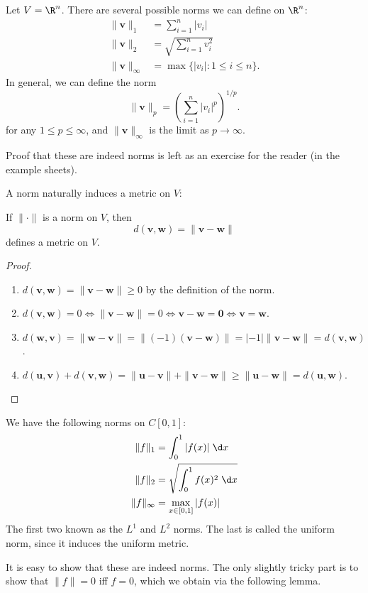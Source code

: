 \documentclass[a4paper]{article}
\begin{document}
\begin{eg}
  Let $V = \R^n$. There are several possible norms we can define on $\R^n$:
  \begin{align*}
    \|\mathbf{v}\|_1 &= \sum_{i = 1}^n  |v_i|\\
    \|\mathbf{v}\|_2 &= \sqrt{\sum_{i = 1}^n v_i^2}\\
    \|\mathbf{v}\|_\infty &= \max \{|v_i|: 1 \leq i \leq n\}.
  \end{align*}
  In general, we can define the norm
  \[
    \|\mathbf{v}\|_p = \left(\sum_{i = 1}^n |v_i|^p\right)^{1/p}.
  \]
  for any $1 \leq p \leq \infty$, and $\|\mathbf{v}\|_\infty$ is the limit as $p\to \infty$.

  Proof that these are indeed norms is left as an exercise for the reader (in the example sheets).
\end{eg}

A norm naturally induces a metric on $V$:
\begin{lemma}
  If $\|\cdot\|$ is a norm on $V$, then
  \[
    d(\mathbf{v}, \mathbf{w}) = \|\mathbf{v} - \mathbf{w}\|
  \]
  defines a metric on $V$.
\end{lemma}

\begin{proof}\leavevmode
  \begin{enumerate}
    \item $d(\mathbf{v}, \mathbf{w}) = \|\mathbf{v} - \mathbf{w}\| \geq 0$ by the definition of the norm.
    \item $d(\mathbf{v}, \mathbf{w}) = 0 \Leftrightarrow \|\mathbf{v} - \mathbf{w}\| = 0 \Leftrightarrow \mathbf{v} - \mathbf{w} = \mathbf{0} \Leftrightarrow \mathbf{v} = \mathbf{w}$.
    \item $d(\mathbf{w}, \mathbf{v}) = \|\mathbf{w} - \mathbf{v}\| = \|(-1)(\mathbf{v} - \mathbf{w})\| = |-1| \|\mathbf{v} - \mathbf{w}\| = d(\mathbf{v}, \mathbf{w})$.
    \item $d(\mathbf{u}, \mathbf{v}) + d(\mathbf{v}, \mathbf{w}) = \|\mathbf{u} - \mathbf{v}\| + \|\mathbf{v} - \mathbf{w}\| \geq \|\mathbf{u} - \mathbf{w}\| = d(\mathbf{u}, \mathbf{w})$.
  \end{enumerate}
\end{proof}

\begin{eg}
  We have the following norms on $C[0, 1]$:
  \begin{align*}
    \|f\|_1 &= \int_0^1 |f(x)|\;\d x\\
    \|f\|_2 &= \sqrt{\int_0^1 f(x)^2 \;\d x}\\
    \|f\|_{\infty} &= \max_{x \in [0, 1]}|f(x)|
  \end{align*}
  The first two known as the $L^1$ and $L^2$ norms. The last is called the uniform norm, since it induces the uniform metric.
\end{eg}
It is easy to show that these are indeed norms. The only slightly tricky part is to show that $\|f\| = 0$ iff $f = 0$, which we obtain via the following lemma.
\end{document}
